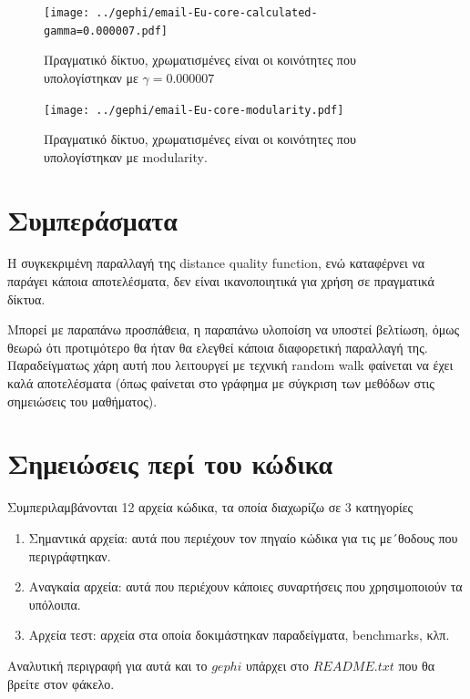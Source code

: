 \documentclass[12pt, letterpaper]{article}
\begin{document}
\begin{figure}
  \centering
  \texttt{[image: ../gephi/email-Eu-core-calculated-gamma=0.000007.pdf]}
  \caption{Πραγματικό δίκτυο, χρωματισμένες είναι οι κοινότητες που υπολογίστηκαν με $\gamma = 0.000007$}
  \label{Eu-gamma}
\end{figure}

\begin{figure}
  \centering
  \texttt{[image: ../gephi/email-Eu-core-modularity.pdf]}
  \caption{Πραγματικό δίκτυο, χρωματισμένες είναι οι κοινότητες που υπολογίστηκαν με \textlatin{modularity}.}
  \label{Eu-modularity}
\end{figure}



\section{Συμπεράσματα}


Η συγκεκριμένη παραλλαγή της \textlatin{distance quality function}, ενώ καταφέρνει να 
παράγει κάποια αποτελέσματα, δεν είναι ικανοποιητικά για χρήση σε πραγματικά δίκτυα. 


Μπορεί με παραπάνω προσπάθεια, η παραπάνω υλοποίση να υποστεί βελτίωση, όμως θεωρώ 
ότι προτιμότερο θα ήταν θα ελεγθεί κάποια διαφορετική παραλλαγή της. Παραδείγματως χάρη 
αυτή που λειτουργεί με τεχνική \textlatin{random walk} φαίνεται να έχει καλά αποτελέσματα 
(όπως φαίνεται στο γράφημα με σύγκριση των μεθόδων στις σημειώσεις του μαθήματος).




\section{Σημειώσεις περί του κώδικα}

Συμπεριλαμβάνονται 12 αρχεία κώδικα, τα οποία διαχωρίζω σε 3 κατηγορίες 

\begin{enumerate}
  \item Σημαντικά αρχεία: αυτά που περιέχουν τον πηγαίο κώδικα για τις με´θοδους που περιγράφτηκαν.
  \item Αναγκαία αρχεία: αυτά που περιέχουν κάποιες συναρτήσεις που χρησιμοποιούν τα υπόλοιπα.
  \item Αρχεία τεστ: αρχεία στα οποία δοκιμάστηκαν παραδείγματα, \textlatin{benchmarks}, κλπ.
\end{enumerate}

Αναλυτική περιγραφή για αυτά και το $gephi$ υπάρχει στο $README.txt$ που θα βρείτε στον φάκελο.



\renewcommand{\refname}{\selectlanguage{greek} Αναφορές}  


\end{document}
